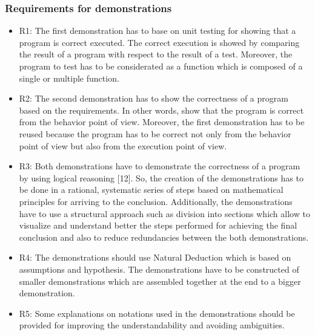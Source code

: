 \documentclass[conference,compsoc]{IEEEtran}
\begin{document}
\subsubsection{Requirements for demonstrations}
\begin{itemize}
	\item R1: The first demonstration has to base on unit testing for showing that a program is correct executed. The correct execution is showed by comparing the result of a program with respect to the result of a test. Moreover, the program to test has to be considerated as a function which is composed of a single or multiple function.
	\newline
	
	\item R2: The second demonstration has to show the correctness of a program based on the requirements. In other words, show that the program is correct from the behavior point of view. Moreover, the first demonstration has to be reused because the program has to be correct not only from the behavior point of view but also from the execution point of view.  
	\newline
	
	\item R3: Both demonstrations have to demonstrate the correctness of a program by using logical reasoning [12]. So, the creation of the demonstrations has to be done in a rational, systematic series of steps based on mathematical principles for arriving to the conclusion. 
\newline	
Additionally, the demonstrations have to use a structural approach such as division into sections which allow to visualize and understand better the steps performed for achieving the final conclusion and also to reduce redundancies between the both demonstrations. 
	\newline
	
	\item R4: The demonstrations should use Natural Deduction which is based on assumptions and hypothesis. The demonstrations have to be constructed of smaller demonstrations which are assembled together at the end to a bigger demonstration. 
	\newline
	
	\item R5: Some explanations on notations used in the demonstrations should be provided for improving the understandability and avoiding ambiguities. 
	\newline\newline
\end{itemize}
\end{document}
